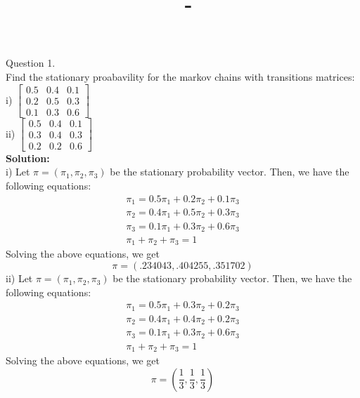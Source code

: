 \documentclass[answers,12pt,addpoints]{exam}
\author{\name}
\title{\course \ - \assignment}
\begin{document}
\maketitle
\begin{questions}
\question Question 1.\\
Find the stationary proabavility for the markov chains with transitions matrices:\\
i) $\begin{bmatrix}
    0.5 & 0.4 & 0.1\\
    0.2 & 0.5 & 0.3\\
    0.1 & 0.3 & 0.6
\end{bmatrix}$\\
ii) $\begin{bmatrix}
    0.5 & 0.4 & 0.1\\
    0.3 & 0.4 & 0.3\\
    0.2 & 0.2 & 0.6
\end{bmatrix}$\\
\textbf{Solution:}\\
i) Let $\pi = (\pi_1, \pi_2, \pi_3)$ be the stationary probability vector. Then, we have the following equations:
\begin{align*}
    \pi_1 = 0.5\pi_1 + 0.2\pi_2 + 0.1\pi_3\\
    \pi_2 = 0.4\pi_1 + 0.5\pi_2 + 0.3\pi_3\\
    \pi_3 = 0.1\pi_1 + 0.3\pi_2 + 0.6\pi_3\\
    \pi_1 + \pi_2 + \pi_3 = 1
\end{align*}
Solving the above equations, we get 
$$\pi = (.234043, .404255, .351702)$$
ii) Let $\pi = (\pi_1, \pi_2, \pi_3)$ be the stationary probability vector. Then, we have the following equations:
\begin{align*}
    \pi_1 = 0.5\pi_1 + 0.3\pi_2 + 0.2\pi_3\\
    \pi_2 = 0.4\pi_1 + 0.4\pi_2 + 0.2\pi_3\\
    \pi_3 = 0.1\pi_1 + 0.3\pi_2 + 0.6\pi_3\\
    \pi_1 + \pi_2 + \pi_3 = 1
\end{align*}
Solving the above equations, we get
$$\pi = (\frac{1}{3}, \frac{1}{3}, \frac{1}{3})$$


\end{questions}
\end{document}
